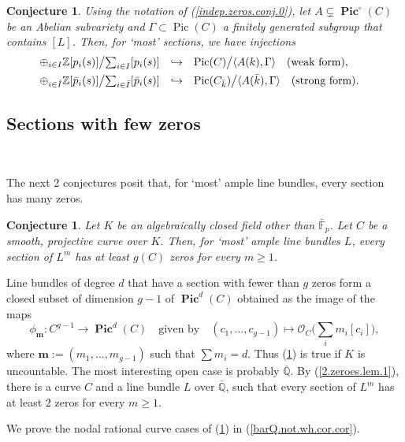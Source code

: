 \documentclass{amsart}
\newtheorem{conj}[thm]{Conjecture}
\theoremstyle{definition}
\theoremstyle{remark}
\renewcommand{\o}[0]{{\mathcal O}}
\newcommand{\z}[0]{{\mathbb Z}}
\newcommand{\f}[0]{{\mathbb F}}
\newcommand{\q}[0]{{\mathbb Q}}
\newcommand{\qtq}[1]{\quad\mbox{#1}\quad}
\newcommand{\pic}[0]{\operatorname{Pic}}
\newcommand{\pics}[0]{\operatorname{\mathbf{Pic}}}
\newcommand{\pico}[0]{\operatorname{\mathbf{Pic}}^{\circ}}
\newcommand{\tsum}[0]{\textstyle{\sum}}
\def\into{\DOTSB\lhook\joinrel\to}
\begin{document}
\begin{conj} \label{indep.zeros.conj} Using the notation of 
(\ref{indep.zeros.conj.0}), let
$A\subsetneq \pico(C)$ be an Abelian subvariety and
$\Gamma\subset \pic(C)$ a finitely generated subgroup that contains $[L]$.
Then, for
`most'  sections, we have injections
$$
\begin{array}{lcl}
\oplus_{i\in I} \z[p_i(s)]\bigl\slash\tsum_{i\in I}   [p_i(s)]  &\into& \pic(C)\bigr\slash \langle  A(k), \Gamma\rangle
\qtq{(weak form),}\\[1ex]
\oplus_{i\in \bar I} \z[\bar p_i(s)]\bigl\slash\tsum_{i\in \bar I}   [\bar p_i(s)]  &\into& \pic(C_{\bar k})\bigr\slash \langle  A(\bar k), \Gamma\rangle
\qtq{(strong form).}
\end{array}
$$
\end{conj}





\medskip


\subsection*{Sections with few zeros}{\ }
\medskip

The next 2 conjectures posit that, for `most' ample line bundles, every section has many zeros. 

\begin{conj}\label{few.zeros.conj.2}
 Let $K$ be an algebraically closed field other than $\bar\f_p$. Let $C$ be a smooth, projective curve over $K$. Then, for `most' ample line bundles $L$, every section of $L^m$ has at least $g(C)$ zeros for every $m\geq 1$.
\end{conj}


Line bundles of degree $d$ that have  a section with fewer than  $g$ zeros
form a closed subset of dimension $ g-1$ of $\pics^d(C)$  obtained as the image of the maps
$$
\phi_{\mathbf m}: C^{g-1}\to  \pics^d(C)\qtq{given by}
(c_1,\dots, c_{g-1})\mapsto \o_C\bigl(\tsum_i m_i[c_i]\bigr),
$$
where ${\mathbf m}:=(m_1,\dots, m_{g-1})$ such that  $\tsum m_i=d$. 
Thus (\ref{few.zeros.conj.2})  is true if $K$ is uncountable. The most interesting open case is probably $\bar\q$. By (\ref{2.zeroes.lem.1}), there is a curve $C$ and a line bundle  $L$ over $\bar\q$,  such that  every section of $L^m$ has at least 2 zeros for every $m\geq 1$.

We prove the nodal rational curve cases of (\ref{few.zeros.conj.2}) in 
(\ref{barQ.not.wh.cor.cor}).
\end{document}
